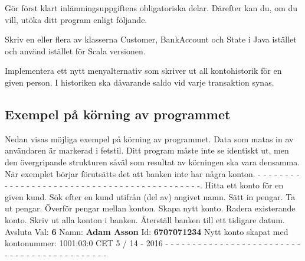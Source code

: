 Gör först klart inlämningsuppgiftens obligatoriska delar. Därefter kan du, om du vill, utöka ditt
program enligt följande.

\Task Skriv en eller flera av klasserna Customer, BankAccount och State i Java istället och använd istället för Scala versionen.

\Task	Implementera ett nytt menyalternativ som skriver ut all kontohistorik för en given person. I historiken ska dåvarande saldo vid varje transaktion synas.

\subsection{Exempel på körning av programmet}

Nedan visas möjliga exempel på körning av programmet. Data som matas in av användaren är markerad i fetstil.
Ditt program måste inte se identiskt ut, men den övergripande strukturen såväl som resultat av körningen ska vara densamma.
När exemplet börjar förutsätts det att banken inte har några konton.
\newline
- - - - - - - - - - - - - - - - - - - - - - - - - - - - - - - - - - - - - - - - - - - -.   Hitta ett konto för en given kund.   Sök efter en kund utifrån (del av) angivet namn.   Sätt in pengar.   Ta ut pengar.   Överför pengar mellan konton.   Skapa nytt konto.   Radera existerande konto.   Skriv ut alla konton i banken.   Återställ banken till ett tidigare datum. Avsluta\newline
Val: \textbf{6}\newline
Namn: \textbf{Adam Asson}\newline
Id: \textbf{6707071234}\newline
Nytt konto skapat med kontonummer: 1001:03:0 CET 5 / 14 - 2016\newline
\newline
- - - - - - - - - - - - - - - - - - - - - - - - - - - - - - - - - - - - - - - - - - - -\newline
